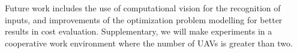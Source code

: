 \documentclass[conference,harvard,brazil,english]{sbatex}
\begin{document}
Future work includes the use of computational vision for the recognition of inputs, and improvements of the optimization problem modelling for better results in cost evaluation. Supplementary, we will make experiments in a cooperative work environment where the number of UAVs is greater than two.

%
%
%
%
\end{document}

